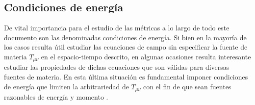 \documentclass[16pt,a4paper]{article}
\numberwithin{equation}{section}
\theoremstyle{definition}
\begin{document}
%
%
%
%
%
%
%
%
%
%

\subsection{Condiciones de energía}

De vital importancia para el estudio de las métricas a lo largo de todo este documento son las denominadas condiciones de energía. Si bien en la mayoría de los casos resulta útil estudiar las ecuaciones de campo sin especificar la fuente de materia $T_{\mu \nu}$ en el espacio-tiempo descrito, en algunas ocasiones resulta interesante estudiar las propiedades de dichas ecuaciones que son válidas para diversas fuentes de materia. En esta última situación es fundamental imponer condiciones de energía que limiten la arbitrariedad de $T_{\mu \nu}$ con el fin de que sean fuentes razonables de energía y momento \cite{carroll}.\\
\end{document}
